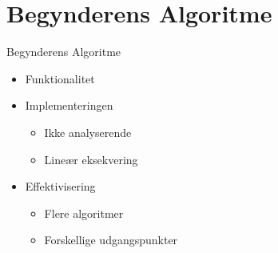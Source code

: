 \section{Begynderens Algoritme}
\begin{frame}{Begynderens Algoritme}
\begin{itemize}
	\item Funktionalitet
	\item Implementeringen
	\begin{itemize}
		\item Ikke analyserende
		\item Line\ae{}r eksekvering
	\end{itemize}
	\item Effektivisering
	\begin{itemize}
		\item Flere algoritmer
		\item Forskellige udgangspunkter
	\end{itemize}
\end{itemize}
\end{frame}